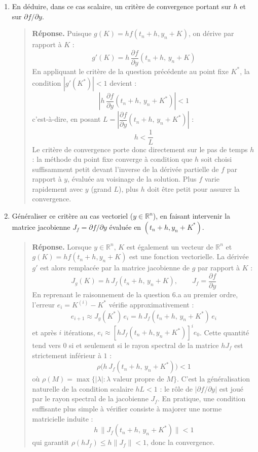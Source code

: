 \documentclass[a4paper, 12pt]{article}
\begin{document}
\begin{enumerate}[resume]
\begin{enumerate}
\begin{quote}
       \textit{Remarque.} Si $|g'(K^*)| > 1$, le même raisonnement montre que $|e_{i+1}| > |e_i|$ au voisinage de $K^*$ : toute perturbation initiale est amplifiée et la méthode diverge.
       \end{quote}

       \item En déduire, dans ce cas scalaire, un critère de convergence portant sur $h$ et sur $\partial f/\partial y$.

       \begin{quote}
       \textbf{Réponse.} Puisque $g(K) = h f(t_n+h, y_n+K)$, on dérive par rapport à $K$ :
       \[
       g'(K) = h \, \frac{\partial f}{\partial y}(t_n+h,\, y_n+K)
       \]
       En appliquant le critère de la question précédente au point fixe $K^*$, la condition $|g'(K^*)| < 1$ devient :
       \[
       \left| h \, \frac{\partial f}{\partial y}(t_n+h,\, y_n+K^*) \right| < 1
       \]
       c'est-à-dire, en posant $L = \left| \dfrac{\partial f}{\partial y}(t_n+h,\, y_n+K^*) \right|$ :
       \[
       h < \frac{1}{L}
       \]
       Le critère de convergence porte donc directement sur le pas de temps $h$ : la méthode du point fixe converge à condition que $h$ soit choisi suffisamment petit devant l'inverse de la dérivée partielle de $f$ par rapport à $y$, évaluée au voisinage de la solution. Plus $f$ varie rapidement avec $y$ (grand $L$), plus $h$ doit être petit pour assurer la convergence.
       \end{quote}

       \item Généraliser ce critère au cas vectoriel ($y \in \mathbb{R}^n$), en faisant intervenir la matrice jacobienne $J_f = \partial f/\partial y$ évaluée en $(t_n+h, y_n+K^*)$.

       \begin{quote}
       \textbf{Réponse.} Lorsque $y \in \mathbb{R}^n$, $K$ est également un vecteur de $\mathbb{R}^n$ et $g(K) = h f(t_n+h, y_n+K)$ est une fonction vectorielle. La dérivée $g'$ est alors remplacée par la matrice jacobienne de $g$ par rapport à $K$ :
       \[
       J_g(K) = h \, J_f(t_n+h,\, y_n+K), \qquad J_f = \frac{\partial f}{\partial y}
       \]
       En reprenant le raisonnement de la question 6.a au premier ordre, l'erreur $e_i = K^{(i)} - K^*$ vérifie approximativement :
       \[
       e_{i+1} \approx J_g(K^*)\, e_i = h\, J_f(t_n+h,\, y_n+K^*)\, e_i
       \]
       et après $i$ itérations, $e_i \approx \left[h J_f(t_n+h, y_n+K^*)\right]^i e_0$. Cette quantité tend vers $0$ si et seulement si le rayon spectral de la matrice $h J_f$ est strictement inférieur à $1$ :
       \[
       \rho\big(h\, J_f(t_n+h,\, y_n+K^*)\big) < 1
       \]
       où $\rho(M) = \max\{|\lambda| : \lambda \text{ valeur propre de } M\}$. C'est la généralisation naturelle de la condition scalaire $hL<1$ : le rôle de $|\partial f/\partial y|$ est joué par le rayon spectral de la jacobienne $J_f$. En pratique, une condition suffisante plus simple à vérifier consiste à majorer une norme matricielle induite :
       \[
       h \, \|J_f(t_n+h,\, y_n+K^*)\| < 1
       \]
       qui garantit $\rho(hJ_f) \le h\|J_f\| < 1$, donc la convergence.


\end{quote}
\end{enumerate}
\end{enumerate}
\end{document}
